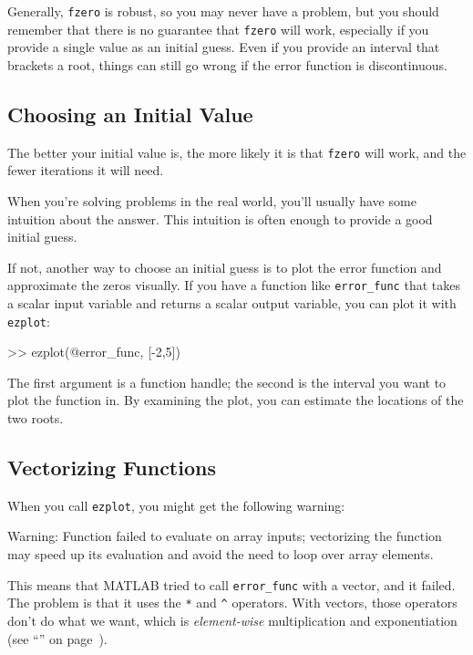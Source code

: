 Generally, \lstinline{fzero} is robust, so you may never have a problem, but you should remember that there is no guarantee that \lstinline{fzero} will work, especially  if you provide a single value as an initial guess.  Even if you provide an interval that brackets a root, things can still go wrong if the error function is discontinuous.


\subsection{Choosing an Initial Value}

The better your initial value is, the more likely it is that
\lstinline{fzero} will work, and the fewer iterations it will
need.

When you're solving problems in the real world, you'll usually
have some intuition about the answer.  This intuition is often enough
to provide  a good initial guess.


If not, another way to choose an initial guess is to plot the error function and
approximate the zeros visually.  If you have a function like
\lstinline{error_func} that takes a scalar input variable and returns
a scalar output variable, you can plot it with \lstinline{ezplot}:

\begin{code}
>> ezplot(@error_func, [-2,5])
\end{code}

The first argument is a function handle; the second is the interval you want to plot the function in.
By examining the plot, you can estimate the locations of the two roots.


\subsection{Vectorizing Functions}


When you call \lstinline{ezplot}, you might get the following warning:

\begin{code}
Warning: Function failed to evaluate on array inputs;
vectorizing the function may speed up its evaluation and
avoid the need to loop over array elements.
\end{code}

This means that MATLAB tried to call \lstinline{error_func} with a vector, and it failed.
The problem is that it uses the \lstinline{*} and \lstinline{^} operators.  With vectors, those operators don't do what we want, which is \emph{element-wise} multiplication and exponentiation
(see ``'' on page~\pageref{elementwise}).

